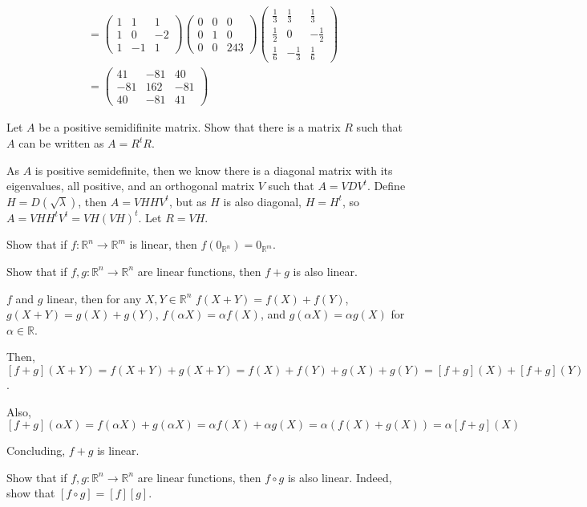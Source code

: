 \documentclass[answers]{exam}
\begin{document}
\begin{questions}
\begin{parts}
\begin{solution}
\begin{align*}
            &= \begin{pmatrix}1 & 1 & 1 \\ 1 & 0 & -2 \\ 1 & -1 & 1 \end{pmatrix} \begin{pmatrix}0 & 0 & 0 \\ 0 & 1 & 0 \\ 0 & 0 & 243\end{pmatrix} \begin{pmatrix} \frac{1}{3} & \frac{1}{3} & \frac{1}{3} \\ \frac{1}{2} & 0 & -\frac{1}{2} \\ \frac{1}{6} & -\frac{1}{3} & \frac{1}{6} \end{pmatrix}\\
            &=\begin{pmatrix}
                    41 & -81 & 40 \\
                    -81 & 162 & -81 \\
                    40 & -81 & 41
            \end{pmatrix}
        \end{align*}
        
    \end{solution}

\end{parts}

\question Let $A$ be a positive semidifinite matrix. Show that there is a matrix $R$ such that $A$ can be written as $A=R^tR$.

\begin{solution}
As $A$ is positive semidefinite, then we know there is a diagonal matrix with its eigenvalues, all positive, and an orthogonal matrix $V$ such that $A=VDV^t$. Define $H=D(\sqrt{\lambda})$, then $A=VHHV^t$, but as $H$ is also diagonal, $H=H^t$, so $A=VHH^tV^t=VH(VH)^t$. Let $R=VH$.
\end{solution}

\question Show that if $f:\mathbb{R}^n\rightarrow\mathbb{R}^m$ is linear, then $f(0_{\mathbb{R}^n})=0_{\mathbb{R}^m}$.

\question Show that if $f,g:\mathbb{R}^n\rightarrow\mathbb{R}^n$ are linear functions, then $f+g$ is also linear.

\begin{solution}
    $f$ and $g$ linear, then for any $X,Y\in\mathbb{R}^n$ $f(X+Y)=f(X)+f(Y)$, $g(X+Y)=g(X)+g(Y)$, $f(\alpha X)=\alpha f(X)$, and $g(\alpha X)=\alpha g(X)$ for $\alpha \in \mathbb{R}$.
    
    Then, $[f+g](X+Y) = f(X+Y)+g(X+Y)=f(X)+f(Y)+g(X)+g(Y)=[f+g](X)+[f+g](Y)$.
    
    Also, $[f+g](\alpha X) = f(\alpha X) + g(\alpha X) = \alpha f(X) + \alpha g(X)=\alpha(f(X)+g(X))=\alpha [f+g](X)$
    
    Concluding, $f+g$ is linear.
\end{solution}

\question Show that if $f,g:\mathbb{R}^n\rightarrow\mathbb{R}^n$ are linear functions, then $f\circ g$ is also linear. Indeed, show that $[f\circ g]=[f][g]$.

\end{questions}
\end{document}
